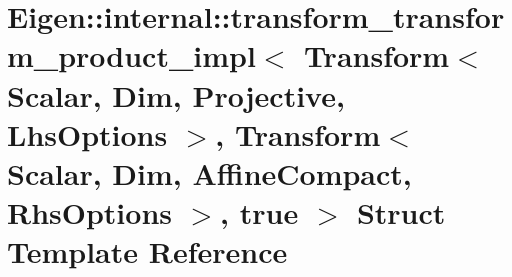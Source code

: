 \hypertarget{struct_eigen_1_1internal_1_1transform__transform__product__impl_3_01_transform_3_01_scalar_00_01b95bea6ac8fd6454e5f4295a3f69392b}{}\section{Eigen\+:\+:internal\+:\+:transform\+\_\+transform\+\_\+product\+\_\+impl$<$ Transform$<$ Scalar, Dim, Projective, Lhs\+Options $>$, Transform$<$ Scalar, Dim, Affine\+Compact, Rhs\+Options $>$, true $>$ Struct Template Reference}
\label{struct_eigen_1_1internal_1_1transform__transform__product__impl_3_01_transform_3_01_scalar_00_01b95bea6ac8fd6454e5f4295a3f69392b}
